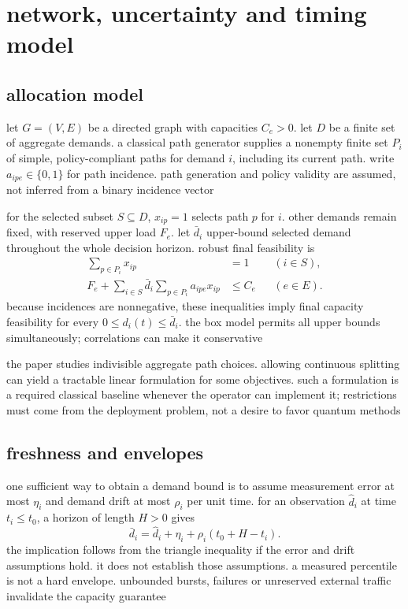 \documentclass[11pt,a4paper]{article}
\newcommand{\1}{\mathbf{1}}
\begin{document}
\section{network, uncertainty and timing model}
\subsection{allocation model}
let $G=(V,E)$ be a directed graph with capacities $C_e>0$. let $D$ be a finite set of aggregate demands. a classical path generator supplies a nonempty finite set $P_i$ of simple, policy-compliant paths for demand $i$, including its current path. write $a_{ipe}\in\{0,1\}$ for path incidence. path generation and policy validity are assumed, not inferred from a binary incidence vector

for the selected subset $S\subseteq D$, $x_{ip}=1$ selects path $p$ for $i$. other demands remain fixed, with reserved upper load $F_e$. let $\bar d_i$ upper-bound selected demand throughout the whole decision horizon. robust final feasibility is
\begin{align}
 \sum_{p\in P_i}x_{ip}&=1 &&(i\in S),\label{eq:onehot}\\
 F_e+\sum_{i\in S}\bar d_i\sum_{p\in P_i}a_{ipe}x_{ip}&\le C_e &&(e\in E).\label{eq:cap}
\end{align}
because incidences are nonnegative, these inequalities imply final capacity feasibility for every $0\le d_i(t)\le\bar d_i$. the box model permits all upper bounds simultaneously; correlations can make it conservative

the paper studies indivisible aggregate path choices. allowing continuous splitting can yield a tractable linear formulation for some objectives. such a formulation is a required classical baseline whenever the operator can implement it; restrictions must come from the deployment problem, not a desire to favor quantum methods

\subsection{freshness and envelopes}
one sufficient way to obtain a demand bound is to assume measurement error at most $\eta_i$ and demand drift at most $\rho_i$ per unit time. for an observation $\hat d_i$ at time $t_i\le t_0$, a horizon of length $H>0$ gives
\begin{equation}
 \bar d_i=\hat d_i+\eta_i+\rho_i(t_0+H-t_i).\label{eq:drift}
\end{equation}
the implication follows from the triangle inequality if the error and drift assumptions hold. it does not establish those assumptions. a measured percentile is not a hard envelope. unbounded bursts, failures or unreserved external traffic invalidate the capacity guarantee
\end{document}
